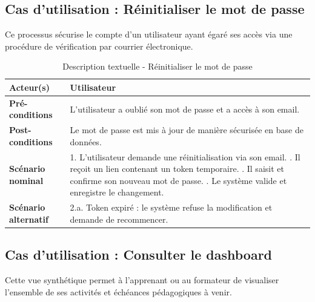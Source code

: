 \subsection{Cas d'utilisation : Réinitialiser le mot de passe}
Ce processus sécurise le compte d'un utilisateur ayant égaré ses accès via une procédure de vérification par courrier électronique.

\begin{table}[H]
\centering
\small
\begin{tabularx}{\textwidth}{|l|X|}
\hline
\rowcolor[HTML]{EFEFEF} 
\textbf{Acteur(s)} & Utilisateur \\ \hline
\textbf{Pré-conditions} & L'utilisateur a oublié son mot de passe et a accès à son email. \\ \hline
\textbf{Post-conditions} & Le mot de passe est mis à jour de manière sécurisée en base de données. \\ \hline
\textbf{Scénario nominal} & 
1. L'utilisateur demande une réinitialisation via son email. \newline
2. Il reçoit un lien contenant un token temporaire. \newline
3. Il saisit et confirme son nouveau mot de passe. \newline
4. Le système valide et enregistre le changement. \\ \hline
\textbf{Scénario alternatif} & 
2.a. Token expiré : le système refuse la modification et demande de recommencer. \\ \hline
\end{tabularx}
\caption{Description textuelle - Réinitialiser le mot de passe}
\end{table}

\subsection{Cas d'utilisation : Consulter le dashboard}
Cette vue synthétique permet à l'apprenant ou au formateur de visualiser l'ensemble de ses activités et échéances pédagogiques à venir.

